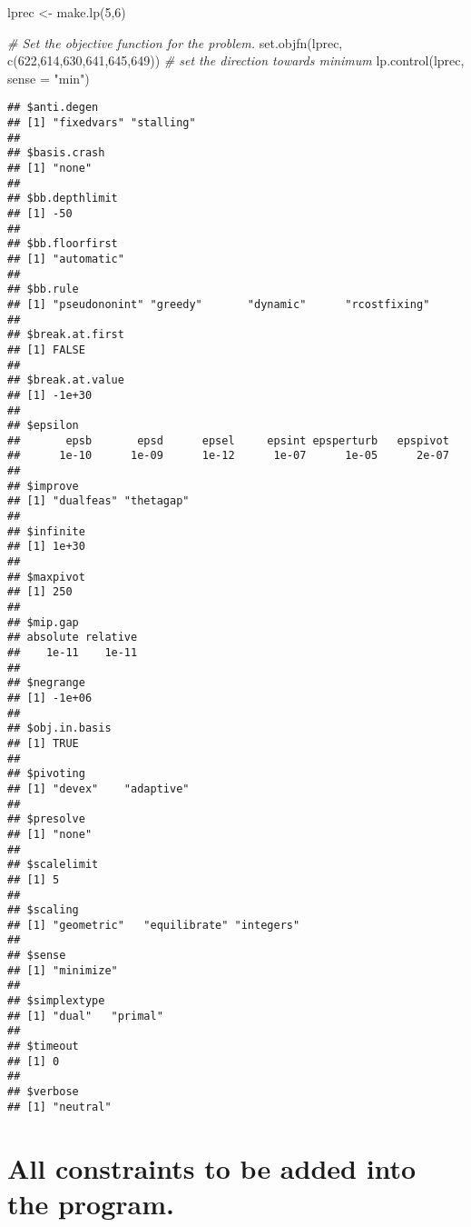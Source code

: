 \documentclass[
]{article}
\newenvironment{Shaded}{\begin{snugshade}}{\end{snugshade}}
\newcommand{\AttributeTok}[1]{\textcolor[rgb]{0.77,0.63,0.00}{#1}}
\newcommand{\CommentTok}[1]{\textcolor[rgb]{0.56,0.35,0.01}{\textit{#1}}}
\newcommand{\DecValTok}[1]{\textcolor[rgb]{0.00,0.00,0.81}{#1}}
\newcommand{\FunctionTok}[1]{\textcolor[rgb]{0.00,0.00,0.00}{#1}}
\newcommand{\NormalTok}[1]{#1}
\newcommand{\OtherTok}[1]{\textcolor[rgb]{0.56,0.35,0.01}{#1}}
\newcommand{\StringTok}[1]{\textcolor[rgb]{0.31,0.60,0.02}{#1}}
\begin{document}
\begin{Shaded}
\begin{Highlighting}[]
\NormalTok{lprec }\OtherTok{\textless{}{-}} \FunctionTok{make.lp}\NormalTok{(}\DecValTok{5}\NormalTok{,}\DecValTok{6}\NormalTok{)}

\CommentTok{\# Set the objective function for the problem.}
\FunctionTok{set.objfn}\NormalTok{(lprec, }\FunctionTok{c}\NormalTok{(}\DecValTok{622}\NormalTok{,}\DecValTok{614}\NormalTok{,}\DecValTok{630}\NormalTok{,}\DecValTok{641}\NormalTok{,}\DecValTok{645}\NormalTok{,}\DecValTok{649}\NormalTok{))}
\CommentTok{\# set the direction towards minimum}
\FunctionTok{lp.control}\NormalTok{(lprec, }\AttributeTok{sense =} \StringTok{"min"}\NormalTok{)}
\end{Highlighting}
\end{Shaded}

\begin{verbatim}
## $anti.degen
## [1] "fixedvars" "stalling" 
## 
## $basis.crash
## [1] "none"
## 
## $bb.depthlimit
## [1] -50
## 
## $bb.floorfirst
## [1] "automatic"
## 
## $bb.rule
## [1] "pseudononint" "greedy"       "dynamic"      "rcostfixing" 
## 
## $break.at.first
## [1] FALSE
## 
## $break.at.value
## [1] -1e+30
## 
## $epsilon
##       epsb       epsd      epsel     epsint epsperturb   epspivot 
##      1e-10      1e-09      1e-12      1e-07      1e-05      2e-07 
## 
## $improve
## [1] "dualfeas" "thetagap"
## 
## $infinite
## [1] 1e+30
## 
## $maxpivot
## [1] 250
## 
## $mip.gap
## absolute relative 
##    1e-11    1e-11 
## 
## $negrange
## [1] -1e+06
## 
## $obj.in.basis
## [1] TRUE
## 
## $pivoting
## [1] "devex"    "adaptive"
## 
## $presolve
## [1] "none"
## 
## $scalelimit
## [1] 5
## 
## $scaling
## [1] "geometric"   "equilibrate" "integers"   
## 
## $sense
## [1] "minimize"
## 
## $simplextype
## [1] "dual"   "primal"
## 
## $timeout
## [1] 0
## 
## $verbose
## [1] "neutral"
\end{verbatim}

\hypertarget{all-constraints-to-be-added-into-the-program.}{%
\section{All constraints to be added into the
program.}\label{all-constraints-to-be-added-into-the-program.}}
\end{document}
